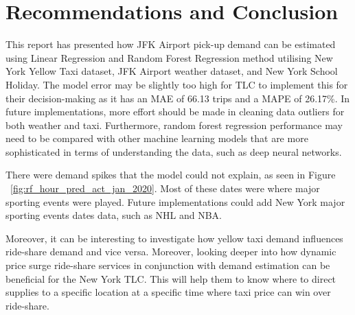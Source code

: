 \documentclass[11pt]{article}
\begin{document}
\section{Recommendations and Conclusion}
This report has presented how JFK Airport pick-up demand can be estimated using Linear Regression and Random Forest Regression method utilising New York Yellow Taxi dataset, JFK Airport weather dataset, and New York School Holiday. The model error may be slightly too high for TLC to implement this for their decision-making as it has an MAE of 66.13 trips and a MAPE of 26.17\%. In future implementations, more effort should be made in cleaning data outliers for both weather and taxi.
Furthermore, random forest regression performance may need to be compared with other machine learning models that are more sophisticated in terms of understanding the data, such as deep neural networks.

There were demand spikes that the model could not explain, as seen in Figure ~\ref{fig:rf_hour_pred_act_jan_2020}. Most of these dates were where major sporting events were played. Future implementations could add New York major sporting events dates data, such as NHL and NBA. 

Moreover, it can be interesting to investigate how yellow taxi demand influences ride-share demand and vice versa. Moreover, looking deeper into how dynamic price surge ride-share services in conjunction with demand estimation can be beneficial for the New York TLC. This will help them to know where to direct supplies to a specific location at a specific time where taxi price can win over ride-share.




\clearpage

\printbibliography
\end{document}
